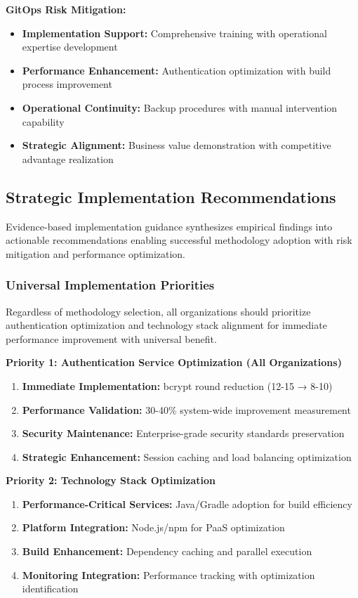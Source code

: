 \textbf{GitOps Risk Mitigation:}
\begin{itemize}
\item \textbf{Implementation Support:} Comprehensive training with operational expertise development
\item \textbf{Performance Enhancement:} Authentication optimization with build process improvement
\item \textbf{Operational Continuity:} Backup procedures with manual intervention capability
\item \textbf{Strategic Alignment:} Business value demonstration with competitive advantage realization
\end{itemize}

\subsection{Strategic Implementation Recommendations}
\label{subsec:implementation_recommendations}

Evidence-based implementation guidance synthesizes empirical findings into actionable recommendations enabling successful methodology adoption with risk mitigation and performance optimization.

\subsubsection{Universal Implementation Priorities}

Regardless of methodology selection, all organizations should prioritize authentication optimization and technology stack alignment for immediate performance improvement with universal benefit.

\textbf{Priority 1: Authentication Service Optimization (All Organizations)}
\begin{enumerate}
\item \textbf{Immediate Implementation:} bcrypt round reduction (12-15 → 8-10)
\item \textbf{Performance Validation:} 30-40\% system-wide improvement measurement
\item \textbf{Security Maintenance:} Enterprise-grade security standards preservation
\item \textbf{Strategic Enhancement:} Session caching and load balancing optimization
\end{enumerate}

\textbf{Priority 2: Technology Stack Optimization}
\begin{enumerate}
\item \textbf{Performance-Critical Services:} Java/Gradle adoption for build efficiency
\item \textbf{Platform Integration:} Node.js/npm for PaaS optimization
\item \textbf{Build Enhancement:} Dependency caching and parallel execution
\item \textbf{Monitoring Integration:} Performance tracking with optimization identification
\end{enumerate}

